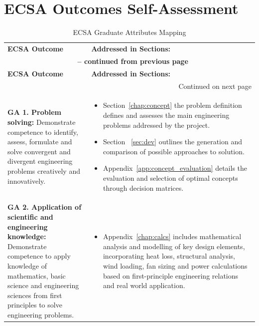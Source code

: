 
\chapter*{ECSA Outcomes Self-Assessment}

\setlength{\tabcolsep}{6pt}
\renewcommand{\arraystretch}{1.15}

\begin{longtable}{|p{}|p{}|}
	\caption{ECSA Graduate Attributes Mapping}%
	\label{tab:ecsa_outcomes} 
	\small
	\\
	
	\hline
	\textbf{ECSA Outcome} & \textbf{Addressed in Sections:} \\
	\hline
	\endfirsthead
	
	\multicolumn{2}{c}{{\bfseries \tablename\ \thetable{} -- continued from previous page}} \\
	\hline
	\textbf{ECSA Outcome} & \textbf{Addressed in Sections:} \\
	\hline
	\endhead
	
	\hline \multicolumn{2}{r}{{Continued on next page}} \\
	\endfoot
	
	\hline
	\endlastfoot
	
	\textbf{GA 1. Problem solving:} Demonstrate competence to identify, assess, formulate and solve convergent and divergent engineering problems creatively and innovatively. &
	\begin{itemize}[leftmargin=*, nosep]
		\item Section~\ref{chap:concept} the problem definition defines and assesses the main engineering problems addressed by the project.
		\item Section ~\ref{sec:dev} outlines the generation and comparison of possible approaches to solution.
		\item Appendix~\ref{app:concept_evaluation} details the evaluation and selection of optimal concepts through decision matrices.
	\end{itemize}
	\\ \hline
	
	\textbf{GA 2. Application of scientific and engineering knowledge:} Demonstrate competence to apply knowledge of mathematics, basic science and engineering sciences from first principles to solve engineering problems. &
	\begin{itemize}[leftmargin=*, nosep]
		\item Appendix~\ref{chap:calcs} includes mathematical analysis and modelling of key design elements, incorporating heat loss, structural analysis, wind loading, fan sizing and power calculations based on first-principle engineering relations and real world application.
	\end{itemize}
	\\ \hline
	

\end{longtable}
